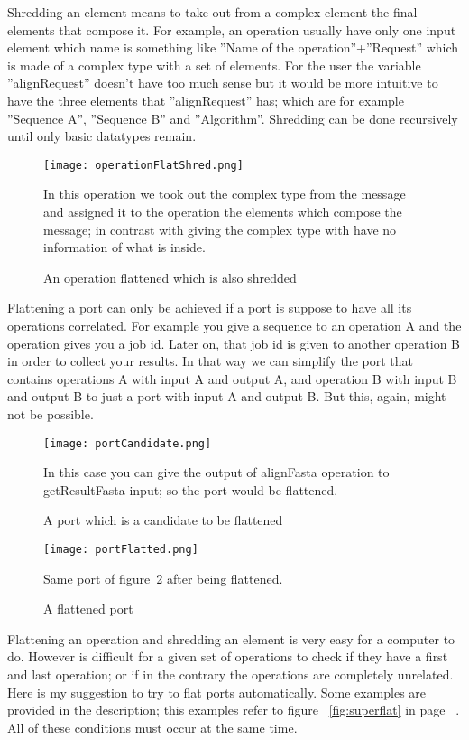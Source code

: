 \documentclass[a4paper,10pt]{article}
\begin{document}
  Shredding an element means to take out from a complex element the final elements that compose it. For example, an operation usually have only one input element which name is something like ''Name of the operation''+''Request'' which is made of a complex type with a set of elements. For the user the variable ''alignRequest'' doesn't have too much sense but it would be more intuitive to have the three elements that ''alignRequest'' has;  which are for example ''Sequence A'', ''Sequence B''  and ''Algorithm''. Shredding can be done recursively until only basic datatypes remain.

  \begin{figure}[H]
  {\centering
  \texttt{[image: operationFlatShred.png]}
  \caption{An operation flattened which is also shredded} \label{fig:operationFlatShred}}
  \medskip
  \small
  In this operation we took out the complex type from the message and assigned it to the operation the elements which compose the message; in contrast with giving the complex type with have no information of what is inside.
  \end{figure}

  Flattening a port can only be achieved if a port is suppose to have all its operations correlated. For example you give a sequence to an operation A and the operation gives you a job id. Later on, that job id is given to another operation B in order to collect your results. In that way we can simplify the port that contains operations A with input A and output A, and operation B with input B and output B to just a port with input A and output B. But this, again, might not be possible.

  \begin{figure}[H]
  {\centering
  \texttt{[image: portCandidate.png]}
  \caption{A port which is a candidate to be flattened} \label{fig:portCandidate}}
  \medskip
  \small
  In this case you can give the output of alignFasta operation to getResultFasta input; so the port would be flattened.
  \end{figure}

  \begin{figure}[H]
  {\centering
  \texttt{[image: portFlatted.png]}
  \caption{A flattened port} \label{fig:portFlatted}}
  \medskip
  \small
  Same port of figure~\ref{fig:portCandidate} after being flattened.
  \end{figure}

  Flattening an operation and shredding an element is very easy for a computer to do. However is difficult for a given set of operations to check if they have a first and last operation; or if in the contrary the operations are completely unrelated. Here is my suggestion to try to flat ports automatically. Some examples are provided in the description; this examples refer to figure ~\ref{fig:superflat} in page ~\pageref{fig:superflat}. All of these conditions must occur at the same time.\vspace{3 mm}
\end{document}
